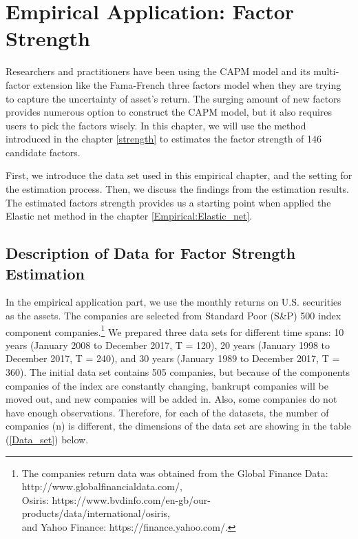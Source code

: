 \chapter{Empirical Application: Factor Strength}\label{Empirical:factor_strength}
	
Researchers and practitioners have been using the CAPM model \cite{Sharpe1964, Lintner1965, Black1972} and its multi-factor extension like the Fama-French three factors model \cite{Fama1992} when they are trying to capture the uncertainty of asset's return.
The surging amount of new factors \cite{Harvey2019} provides numerous option to construct the CAPM model, but it also requires users to pick the factors wisely.
In this chapter, we will use the method introduced in the chapter \ref{strength} to estimates the factor strength of 146 candidate factors.

First, we introduce the data set used in this empirical chapter, and the setting for the estimation process.
Then, we discuss the findings from the estimation results.
The estimated factors strength provides us a starting point when applied the Elastic net method in the chapter \ref{Empirical:Elastic_net}.
	\section{Description of Data for Factor Strength Estimation}\label{data}
	
In the empirical application part, we use the monthly returns on U.S. securities as the assets.
The companies are selected from Standard Poor (S\&P) 500 index component companies.\footnote{The companies return data was obtained from the Global Finance Data: http://www.globalfinancialdata.com/,\\ Osiris: https://www.bvdinfo.com/en-gb/our-products/data/international/osiris, \\and Yahoo Finance: https://finance.yahoo.com/.}
We prepared three data sets for different time spans: 10 years (January 2008 to December 2017, T = 120), 20 years (January 1998 to December 2017, T  = 240), and 30 years (January 1989 to December 2017, T = 360).
The initial data set contains 505 companies, but because of the components companies of the index are constantly changing, bankrupt companies will be moved out, and new companies will be added in.
Also, some companies do not have enough observations.
Therefore, for each of the datasets, the number of companies (n) is different, the dimensions of the data set are showing in the table (\ref{Data_set}) below.


